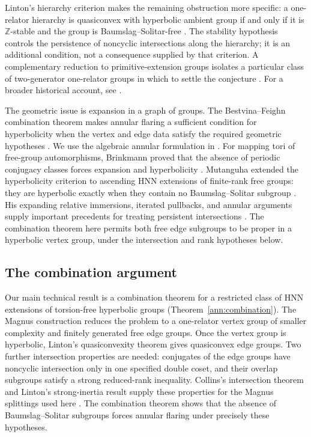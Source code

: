 Linton's hierarchy criterion makes the remaining obstruction more
specific: a one-relator hierarchy is quasiconvex with hyperbolic
ambient group if and only if it is $\mathbb Z$-stable and the group is
Baumslag--Solitar-free
\cite[Theorem~7.1]{LintonHierarchies2025}.
The stability hypothesis controls the persistence of noncyclic
intersections along the hierarchy; it is an additional condition,
not a consequence supplied by that criterion.
A complementary reduction to primitive-extension groups isolates a
particular class of two-generator one-relator groups in which to
settle the conjecture
\cite[Theorem~5.6 and Corollary~5.7]{LintonHyperbolic2026}.
For a broader historical account, see
\cite{LintonNybergBrodda2025Survey}.

The geometric issue is expansion in a graph of groups. The
Bestvina--Feighn combination theorem makes annular flaring a sufficient
condition for hyperbolicity when the vertex and edge data satisfy the
required geometric hypotheses
\cite[Theorem~1.2]{BestvinaFeighn1996Addendum}.
We use the algebraic annular formulation in
\cite[Theorem~4.5]{Kapovich1999NonQuasiconvexity}.
For mapping tori of free-group automorphisms, Brinkmann proved that
the absence of periodic conjugacy classes forces expansion and
hyperbolicity \cite{Brinkmann2000HyperbolicAutomorphisms}.
Mutanguha extended the hyperbolicity criterion to ascending HNN
extensions of finite-rank free groups: they are hyperbolic exactly
when they contain no Baumslag--Solitar subgroup
\cite[Theorem~6.7]{Mutanguha2021}.
His expanding relative immersions, iterated pullbacks, and annular
arguments supply important precedents for treating persistent
intersections \cite[Theorem~4.5 and Sections~5--6]{Mutanguha2021}.
The combination theorem here permits both free edge subgroups to be
proper in a hyperbolic vertex group, under the intersection and rank
hypotheses below.

\subsection{The combination argument}

Our main technical result is a combination theorem for a restricted
class of HNN extensions of torsion-free hyperbolic groups
(Theorem~\ref{ann:combination}). The Magnus construction reduces the problem to a one-relator vertex
group of smaller complexity and finitely generated free edge groups.
Once the vertex group is hyperbolic, Linton's quasiconvexity theorem gives
quasiconvex edge groups. Two further intersection properties are needed:
conjugates of the edge groups have noncyclic intersection only in one
specified double coset, and their overlap subgroups satisfy a strong
reduced-rank inequality.
Collins's intersection theorem and Linton's strong-inertia result supply
these properties for the Magnus splittings used here
\cite{Collins2008Conjugates,LintonHierarchies2025}.
The combination theorem shows that the absence of Baumslag--Solitar
subgroups forces annular flaring under precisely these hypotheses.

